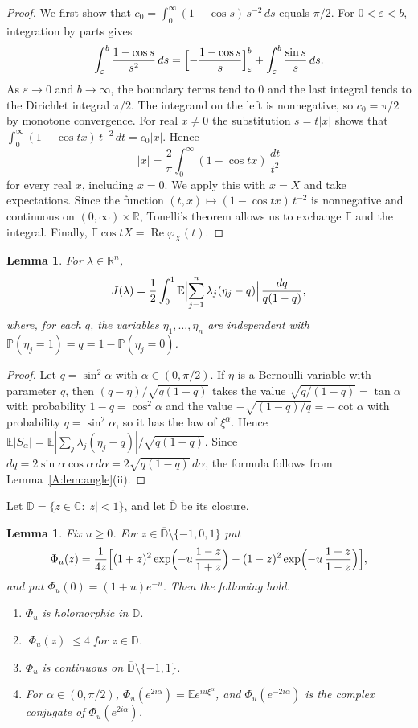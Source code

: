 \documentclass[11pt]{amsart}
\newtheorem{lemma}[theorem]{Lemma}
\theoremstyle{remark}
\numberwithin{equation}{section}
\newcommand{\R}{\mathbb{R}}
\newcommand{\E}{\mathbb{E}}
\renewcommand{\P}{\mathbb{P}}
\newcommand{\eps}{\varepsilon}
\begin{document}
\begin{proof}
We first show that $c_0=\int_0^\infty(1-\cos s)\,s^{-2}\,ds$ equals $\pi/2$. For $0<\eps<b$, integration by parts gives
\[
\int_\eps^b\frac{1-\cos s}{s^2}\,ds=\Bigl[-\frac{1-\cos s}{s}\Bigr]_\eps^b+\int_\eps^b\frac{\sin s}{s}\,ds.
\]
As $\eps\to0$ and $b\to\infty$, the boundary terms tend to $0$ and the last integral tends to the Dirichlet integral $\pi/2$. The integrand on the left is nonnegative, so $c_0=\pi/2$ by monotone convergence. For real $x\ne0$ the substitution $s=t|x|$ shows that $\int_0^\infty(1-\cos tx)\,t^{-2}\,dt=c_0|x|$. Hence
\[
|x|=\frac2\pi\int_0^\infty(1-\cos tx)\,\frac{dt}{t^2}
\]
for every real $x$, including $x=0$. We apply this with $x=X$ and take expectations. Since the function $(t,x)\mapsto(1-\cos tx)\,t^{-2}$ is nonnegative and continuous on $(0,\infty)\times\R$, Tonelli's theorem allows us to exchange $\E$ and the integral. Finally, $\E\cos tX=\operatorname{Re}\varphi_X(t)$.
\end{proof}

\begin{lemma}\label{A:lem:qform}
For $\lambda\in\R^n$,
\[
J(\lambda)=\frac12\int_0^1\E\Bigl|\sum_{j=1}^n\lambda_j(\eta_j-q)\Bigr|\,\frac{dq}{q(1-q)},
\]
where, for each $q$, the variables $\eta_1,\dots,\eta_n$ are independent with $\P(\eta_j=1)=q=1-\P(\eta_j=0)$.
\end{lemma}

\begin{proof}
Let $q=\sin^2\alpha$ with $\alpha\in(0,\pi/2)$. If $\eta$ is a Bernoulli variable with parameter $q$, then $(q-\eta)/\sqrt{q(1-q)}$ takes the value $\sqrt{q/(1-q)}=\tan\alpha$ with probability $1-q=\cos^2\alpha$ and the value $-\sqrt{(1-q)/q}=-\cot\alpha$ with probability $q=\sin^2\alpha$, so it has the law of $\xi^\alpha$. Hence $\E|S_\alpha|=\E|\sum_j\lambda_j(\eta_j-q)|/\sqrt{q(1-q)}$. Since $dq=2\sin\alpha\cos\alpha\,d\alpha=2\sqrt{q(1-q)}\,d\alpha$, the formula follows from Lemma~\ref{A:lem:angle}(ii).
\end{proof}

Let $\mathbb D=\{z\in\mathbb C:|z|<1\}$, and let $\overline{\mathbb D}$ be its closure.

\begin{lemma}\label{A:lem:Phi}
Fix $u\ge0$. For $z\in\overline{\mathbb D}\setminus\{-1,0,1\}$ put
\[
\Phi_u(z)=\frac1{4z}\Bigl[(1+z)^2\exp\Bigl(-u\,\frac{1-z}{1+z}\Bigr)-(1-z)^2\exp\Bigl(-u\,\frac{1+z}{1-z}\Bigr)\Bigr],
\]
and put $\Phi_u(0)=(1+u)e^{-u}$. Then the following hold.
\begin{enumerate}[label=(\alph*)]
\item $\Phi_u$ is holomorphic in $\mathbb D$.
\item $|\Phi_u(z)|\le4$ for $z\in\mathbb D$.
\item $\Phi_u$ is continuous on $\overline{\mathbb D}\setminus\{-1,1\}$.
\item For $\alpha\in(0,\pi/2)$, $\Phi_u(e^{2i\alpha})=\E e^{iu\xi^\alpha}$, and $\Phi_u(e^{-2i\alpha})$ is the complex conjugate of $\Phi_u(e^{2i\alpha})$.
\end{enumerate}
\end{lemma}
\end{document}

